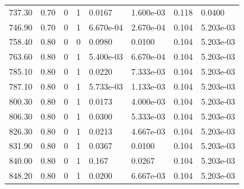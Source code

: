 \documentclass[preview]{standalone}
\begin{document}
{{{\begin{tabular}{L{1.2cm}C{1.2cm} C{0.3cm}C{0.5cm} C{1.4cm}C{1.4cm} C{1.4cm}C{1.4cm}}
  737.30  &  0.70  & 0     &  1 &  0.0167  & 1.600e-03  & 0.118 &  0.0400   \\ 
  746.90  &  0.70  & 0     &  1 &  6.670e-04  & 2.670e-04  & 0.104 &  5.203e-03   \\ 
  758.40  &  0.80  & 0     &  0 &  0.0980  & 0.0100  & 0.104 &  5.203e-03   \\ 
  763.60  &  0.80  & 0     &  1 &  5.400e-03  & 6.670e-04  & 0.104 &  5.203e-03   \\ 
  785.10  &  0.80  & 0     &  1 &  0.0220  & 7.333e-03  & 0.104 &  5.203e-03   \\ 
  787.10  &  0.80  & 0     &  1 &  5.733e-03  & 1.133e-03  & 0.104 &  5.203e-03   \\ 
  800.30  &  0.80  & 0     &  1 &  0.0173  & 4.000e-03  & 0.104 &  5.203e-03   \\ 
  806.30  &  0.80  & 0     &  1 &  0.0300  & 5.333e-03  & 0.104 &  5.203e-03   \\ 
  826.30  &  0.80  & 0     &  1 &  0.0213  & 4.667e-03  & 0.104 &  5.203e-03   \\ 
  831.90  &  0.80  & 0     &  1 &  0.0367  & 0.0100  & 0.104 &  5.203e-03   \\ 
  840.00  &  0.80  & 0     &  1 &  0.167  & 0.0267  & 0.104 &  5.203e-03   \\ 
  848.20  &  0.80  & 0     &  1 &  0.0200  & 6.667e-03  & 0.104 &  5.203e-03   \\ 
\hline 
\end{tabular} 

}}}
\end{document}
